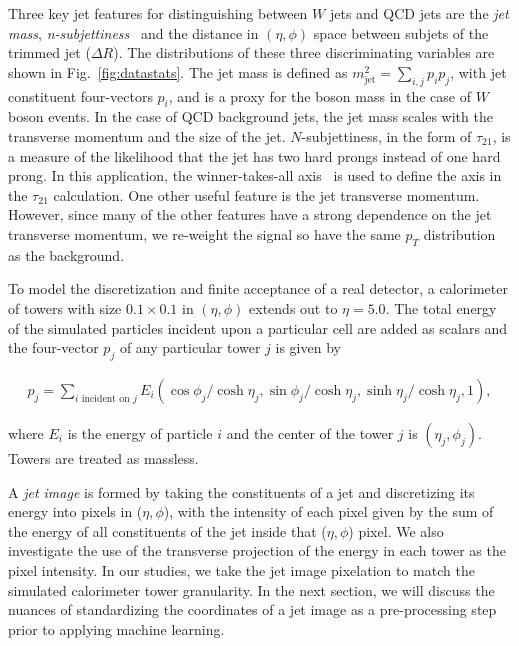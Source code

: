 Three key jet features for distinguishing between $W$ jets and QCD jets are the {\it jet mass}, {\it n-subjettiness}~\cite{nsub} and the distance in $(\eta,\phi)$ space between subjets of the trimmed jet ($\Delta R$).  The distributions of these three discriminating variables are shown in Fig.~\ref{fig:datastats}.   The jet mass is defined as $m_\text{jet}^2=\sum_{i,j} p_i p_j$, with jet constituent four-vectors $p_i$, and is a proxy for the boson mass in the case of $W$ boson events.  In the case of QCD background jets, the jet mass scales with the transverse momentum and the size of the jet.  $N$-subjettiness, in the form of $\tau_{21}$, is a measure of the likelihood that the jet has two hard prongs instead of one hard prong.  In this application, the winner-takes-all axis~\cite{Larkoski:2014uqa} is used to define the axis in the $\tau_{21}$ calculation.  One other useful feature is the jet transverse momentum.  However, since many of the other features have a strong dependence on the jet transverse momentum, we re-weight the signal so have the same $p_T$ distribution as the background.

To model the discretization and finite acceptance of a real detector, a calorimeter of towers with size $0.1\times 0.1$ in $(\eta,\phi)$ extends out to $\eta=5.0$.  The total energy of the simulated particles incident upon a particular cell are added as scalars and the four-vector $p_j$ of any particular tower $j$ is given by

\begin{align}
\label{eq:calo}
p_j = \sum_{i\text{ incident on $j$}}E_i(\cos\phi_j/\cosh \eta_j,\sin\phi_j/\cosh \eta_j,\sinh \eta_j/\cosh \eta_j,1),
\end{align}

\noindent where $E_i$ is the energy of particle $i$ and the center of the tower $j$ is $(\eta_j,\phi_j)$.  Towers are treated as massless.

 A {\it jet image} is formed by taking the constituents of a jet and discretizing its energy into pixels in ($\eta,\phi$), with the intensity of each pixel given by the sum of the energy of all constituents of the jet inside that ($\eta,\phi$) pixel.  We also investigate the use of the transverse projection of the energy in each tower as the pixel intensity.  In our studies, we take the jet image pixelation to match the simulated calorimeter tower granularity.  In the next section, we will discuss the nuances of standardizing the coordinates of a jet image as a pre-processing step prior to applying machine learning.  

